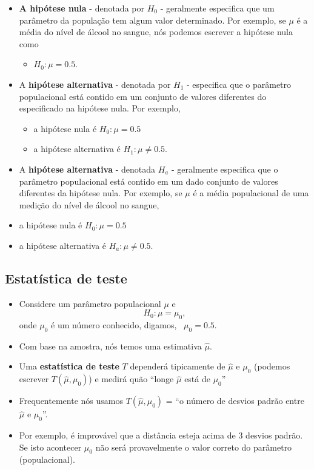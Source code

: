 \documentclass[]{article}
\providecommand{\tightlist}{%
  \setlength{\itemsep}{0pt}\setlength{\parskip}{0pt}}
\begin{document}
\begin{itemize}
\tightlist
\item
  \textbf{A hipótese nula} - denotada por \(H_0\) - geralmente
  especifica que um parâmetro da população tem algum valor determinado.
  Por exemplo, se \(\mu\) é a média do nível de álcool no sangue, nós
  podemos escrever a hipótese nula como

  \begin{itemize}
  \tightlist
  \item
    \(H_0 : \mu = 0.5\).
  \end{itemize}
\item
  A \textbf{hipótese alternativa} - denotada por \(H_1\) - especifica
  que o parâmetro populacional está contido em um conjunto de valores
  diferentes do especificado na hipótese nula. Por exemplo,

  \begin{itemize}
  \tightlist
  \item
    a hipótese nula é \(H_0 : \mu = 0.5\)
  \item
    a hipótese alternativa é \(H_1 : \mu \neq 0.5\).
  \end{itemize}
\item
  A \textbf{hipótese alternativa} - denotada \(H_a\) - geralmente
  especifica que o parâmetro populacional está contido em um dado
  conjunto de valores diferentes da hipótese nula. Por exemplo, se
  \(\mu\) é a média populacional de uma medição do nível de álcool no
  sangue,
\item
  a hipótese nula é \(H_0: \mu = 0.5\)
\item
  a hipótese alternativa é \(H_a: \mu \neq 0.5\).
\end{itemize}

\subsection{Estatística de teste}\label{estatistica-de-teste}

\begin{itemize}
\tightlist
\item
  Considere um parâmetro populacional \(\mu\) e \[
    H_0:\mu = \mu_0,
    \] onde \(\mu_0\) é um número conhecido, digamos, ~\(\mu_0 = 0.5\).
\item
  Com base na amostra, nós temos uma estimativa \(\hat{\mu}\).
\item
  Uma \textbf{estatística de teste} \(T\) dependerá tipicamente de
  \(\hat{\mu}\) e \(\mu_0\) (podemos escrever \(T(\hat{\mu}, \mu_0)\)) e
  medirá quão ``longe \(\hat{\mu}\) está de \(\mu_0\)''
\item
  Frequentemente nós usamos \(T(\hat{\mu},\mu_0)\) = ``o número de
  desvios padrão entre \(\hat{\mu}\) e \(\mu_0\)''.
\item
  Por exemplo, é improvável que a distância esteja acima de 3 desvios
  padrão. Se isto acontecer \(\mu_0\) não será provavelmente o valor
  correto do parâmetro (populacional).
\end{itemize}
\end{document}
